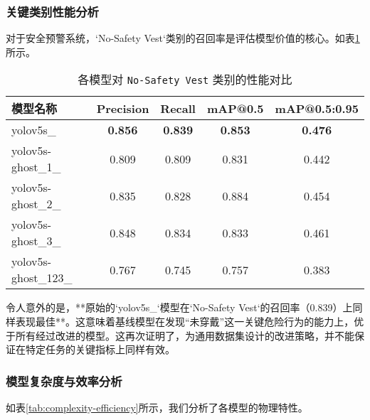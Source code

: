 \documentclass[a4paper]{ctexart}
\begin{document}
\subsubsection{关键类别性能分析}
对于安全预警系统，`No-Safety Vest`类别的召回率是评估模型价值的核心。如表\ref{tab:critical-class-performance}所示。

\begin{table}[H]
    \centering
    \caption{各模型对 \texttt{No-Safety Vest} 类别的性能对比}
    \label{tab:critical-class-performance}
    \begin{tabular}{lcccc}
        \toprule
        \textbf{模型名称} & \textbf{Precision} & \textbf{Recall} & \textbf{mAP@0.5} & \textbf{mAP@0.5:0.95} \\
        \midrule
        yolov5s\_             & \textbf{0.856} & \textbf{0.839} & \textbf{0.853} & \textbf{0.476} \\
        yolov5s-ghost\_1\_    & 0.809          & 0.809          & 0.831          & 0.442          \\
        yolov5s-ghost\_2\_    & 0.835          & 0.828          & 0.884          & 0.454          \\
        yolov5s-ghost\_3\_    & 0.848          & 0.834          & 0.833          & 0.461          \\
        yolov5s-ghost\_123\_  & 0.767          & 0.745          & 0.757          & 0.383          \\
        \bottomrule
    \end{tabular}
\end{table}

令人意外的是，**原始的`yolov5s_`模型在`No-Safety Vest`的召回率（0.839）上同样表现最佳**。这意味着基线模型在发现“未穿戴”这一关键危险行为的能力上，优于所有经过改进的模型。这再次证明了，为通用数据集设计的改进策略，并不能保证在特定任务的关键指标上同样有效。

\subsubsection{模型复杂度与效率分析}
如表\ref{tab:complexity-efficiency}所示，我们分析了各模型的物理特性。
\end{document}
